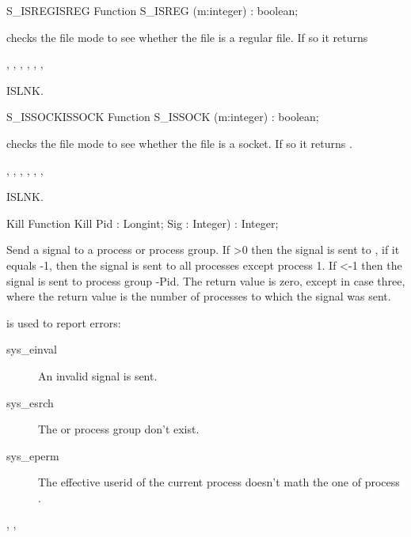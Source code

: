 \begin{functionl}{S\_ISREG}{ISREG}
\Declaration
Function S\_ISREG (m:integer) : boolean;

\Description
  checks the file mode  to see whether the file is a
regular file. If so it returns 

\Errors
{},
 , 
 ,
 ,
 ,
 ,

\SeeAlso
ISLNK.
\end{functionl}
\begin{functionl}{S\_ISSOCK}{ISSOCK}
\Declaration
Function S\_ISSOCK (m:integer) : boolean;

\Description
  checks the file mode  to see whether the file is a
socket. If so it returns .

\Errors
{},
 , 
 ,
 ,
 ,
 ,

\SeeAlso
ISLNK.
\end{functionl}
\begin{function}{Kill}
\Declaration
Function Kill Pid : Longint; Sig : Integer) : Integer;

\Description
 Send a signal  to a process or process group. If >0 then
the signal is sent to , if it equals -1, then the signal is sent to
all processes except process 1. If <-1 then the signal is sent to
process group -Pid.
The return value is zero, except in case three, where the return value is the
number of processes to which the signal was sent.

\Errors
{} is used to report errors:
\begin{description}
\item[sys\_einval] An invalid signal is sent.
\item[sys\_esrch] The  or process group don't exist.
\item[sys\_eperm] The effective userid of the current process doesn't math
the one of process .
\end{description}

\SeeAlso
{}, ,  
\end{function}
